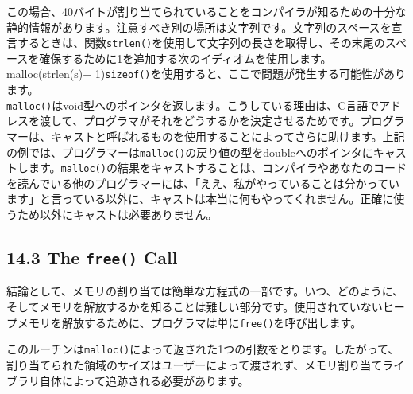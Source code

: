 \begin{Shaded}
\begin{Highlighting}[]
\NormalTok{ x[}\NormalTok{];}
\NormalTok{, }
\end{Highlighting}
\end{Shaded}

この場合、40バイトが割り当てられていることをコンパイラが知るための十分な静的情報があります。注意すべき別の場所は文字列です。文字列のスペースを宣言するときは、関数\texttt{strlen()}を使用して文字列の長さを取得し、その末尾のスペースを確保するために1を追加する次のイディオムを使用します。malloc(strlen(s)+
1)\texttt{sizeof()}を使用すると、ここで問題が発生する可能性があります。\\
\texttt{malloc()}はvoid型へのポインタを返します。こうしている理由は、C言語でアドレスを渡して、プログラマがそれをどうするかを決定させるためです。プログラマーは、キャストと呼ばれるものを使用することによってさらに助けます。上記の例では、プログラマーは\texttt{malloc()}の戻り値の型をdoubleへのポインタにキャストします。\texttt{malloc()}の結果をキャストすることは、コンパイラやあなたのコードを読んでいる他のプログラマーには、「ええ、私がやっていることは分かっています」と言っている以外に、キャストは本当に何もやってくれません。正確に使うため以外にキャストは必要ありません。

\hypertarget{the-free-call}{%
\subsection*{\texorpdfstring{14.3 The \texttt{free()}
Call}{14.3 The free() Call}}\label{the-free-call}}

結論として、メモリの割り当ては簡単な方程式の一部です。いつ、どのように、そしてメモリを解放するかを知ることは難しい部分です。使用されていないヒープメモリを解放するために、プログラマは単に\texttt{free()}を呼び出します。

\begin{Shaded}
\begin{Highlighting}[]
\NormalTok{ * }\NormalTok{(}\NormalTok{));}
\end{Highlighting}
\end{Shaded}

このルーチンは\texttt{malloc()}によって返された1つの引数をとります。したがって、割り当てられた領域のサイズはユーザーによって渡されず、メモリ割り当てライブラリ自体によって追跡される必要があります。

